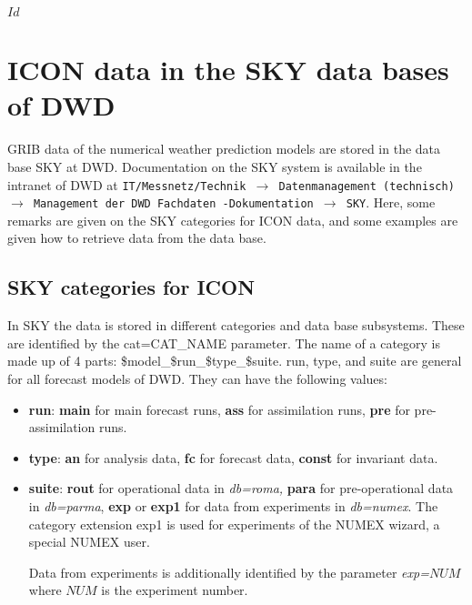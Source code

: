 \svnInfo $Id$
\chapter{ICON data in the SKY data bases of DWD}


GRIB data of the numerical weather prediction models are stored in the data base
SKY at DWD.
Documentation on the SKY system is available in the intranet of DWD at
{\tt IT/Messnetz/Technik $\rightarrow$ Datenmanagement (technisch) $\rightarrow$
Management der DWD Fachdaten -Dokumentation $\rightarrow$ SKY}.
Here, some remarks are given on the SKY categories for ICON data, and some
examples are given how to retrieve data from the data base.

\section{SKY categories for ICON}

In SKY the data is stored in different categories and data base subsystems.
These are identified by the cat=CAT\_NAME parameter.
The name of a category is made up
of 4 parts: \${model}\_\${run}\_\${type}\_\${suite}. run, type, and suite are general
for all forecast models of DWD. They can have the following values:


\begin{itemize}
 \item \textbf{run}: \textbf{main} for main forecast runs,
                     \textbf{ass} for assimilation runs,
                     \textbf{pre} for pre-assimilation runs.
 \item \textbf{type}: \textbf{an} for analysis data,
                      \textbf{fc} for forecast data,
                      \textbf{const} for invariant data.
 \item \textbf{suite}: \textbf{rout} for operational data in \emph{db=roma,}
                       \textbf{para} for pre-operational data in \emph{db=parma},
                       \textbf{exp} or \textbf{exp1} for data from experiments in
                       \emph{db=numex}. The category extension exp1 is used for
                       experiments of the NUMEX wizard, a special NUMEX user.

                       Data from experiments is additionally
                       identified by the parameter \emph{exp=}$NUM$ where $NUM$ is
                       the experiment number.
\end{itemize}

